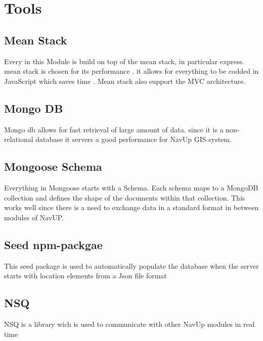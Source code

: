 \documentclass{article}
\begin{document}
\section{Tools}
	\subsection{Mean Stack}
		Every in this Module is build on top of the mean stack, in particular express. mean stack is chosen for its performance 
		. it allows for everything to be codded in JavaScript which saves time . Mean stack also support the MVC architecture.
	\subsection{Mongo DB}
		Mongo db allows for fast retrieval of large amount of data. since it is a non-relational database it servers a good 				performance for NavUp GIS system.
	\subsection{Mongoose Schema}
		Everything in Mongoose starts with a Schema. Each schema maps to a MongoDB collection and defines the shape of the 		documents within that collection. 
		This works well since there is a need to exchange data in a standard format in between modules of NavUP.
	\subsection{Seed npm-packgae}
		This seed package is used to automatically populate the database when the server starts with location elements from a Json file format
	\subsection{NSQ}
		NSQ is a library wich is used to communicate with other NavUp modules in real time
\end{document}
